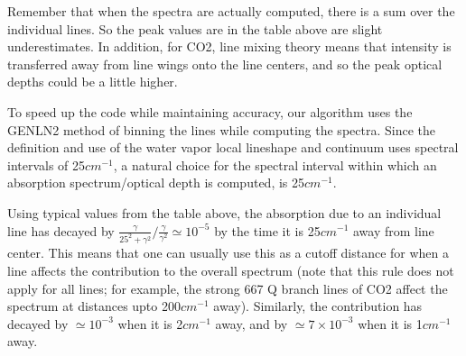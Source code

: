 \documentclass[11pt]{article}
\begin{document}
Remember that when the spectra are actually computed, there is a sum over 
the individual lines. So the peak values are in the table above are slight 
underestimates. In addition, for CO2, line mixing theory means that 
intensity is transferred away from line wings onto the line centers, and 
so the peak optical depths could be a little higher. 

To speed up the code while maintaining accuracy, our algorithm uses the 
GENLN2 method of binning the lines while computing the
spectra. Since the definition and use of the water vapor local lineshape 
and continuum uses spectral intervals of 25$cm^{-1}$, a natural choice for
the spectral interval within which an absorption spectrum/optical depth is 
computed, is 25$cm^{-1}$. 

Using typical values from the table above, the
absorption due to an individual line has decayed by 
$ \frac{\gamma}{25^{2}+\gamma^{2}}/\frac{\gamma}{\gamma^{2}}\simeq 10^{-5}$
by the time it is 25$cm^{-1}$ away from line center. This means that one can
usually use this as a cutoff distance for when a line affects the 
contribution to the overall spectrum (note that this rule does not apply for
all lines; for example, the strong 667 Q branch lines of CO2 affect the
spectrum at distances upto 200$cm^{-1}$ away). 
Similarly, the contribution has decayed by $\simeq 10^{-3}$ when it is 
2$cm^{-1}$ away, and by $\simeq 7 \times 10^{-3}$ when it is 
1$cm^{-1}$ away.
\end{document}
